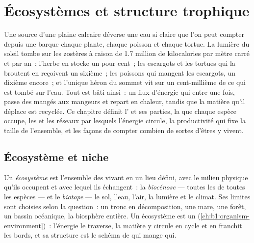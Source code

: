 \chapter{Écosystèmes et structure trophique}\label{ch:b1:ecosystem-organization}

Une source d'une plaine calcaire déverse une eau si claire que l'on
peut compter depuis une barque chaque plante, chaque poisson et chaque
tortue. La lumière du soleil tombe sur les zostères à raison de
\qty{1.7}{} million de kilocalories par mètre carré et par an~; l'herbe
en stocke un pour cent~; les escargots et les tortues qui la broutent en
reçoivent un sixième~; les poissons qui mangent les escargots, un
dixième encore~; et l'unique héron du sommet vit sur un cent-millième de
ce qui est tombé sur l'eau. Tout  est bâti ainsi~: un flux
d'énergie qui entre une fois, passe des mangés aux mangeurs et repart
en chaleur, tandis que la matière qu'il déplace est recyclée. Ce
chapitre définit l' et ses parties, la  que chaque
espèce occupe, les  et les réseaux par lesquels
l'énergie circule, la productivité qui fixe la taille de l'ensemble, et
les façons de compter combien de sortes d'êtres y vivent.

\section{Écosystème et niche}

\begin{definition}\label{def:b1:ecosystem-organization:ecosystem}
Un \emph{écosystème} est l'ensemble des  vivant en un lieu
défini, avec le milieu physique qu'ils occupent et avec lequel ils
échangent~: la \emph{biocénose} --- toutes les  de toutes les
espèces --- et le \emph{biotope} --- le sol, l'eau, l'air, la lumière et
le climat. Ses limites sont choisies selon la question~: un tronc en
décomposition, une mare, une forêt, un bassin océanique, la biosphère
entière. Un écosystème est un 
(\cref{ch:b1:organism-environment})~: l'énergie le traverse, la matière
y circule en cycle et en franchit les bords, et sa structure est le
schéma de qui mange qui.
\end{definition}

